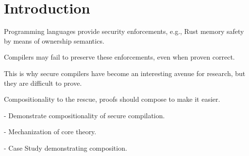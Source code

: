 

\section{Introduction}\label{sec:introduction}

Programming languages provide security enforcements, e.g., Rust memory safety by means of ownership semantics.

Compilers may fail to preserve these enforcements, even when proven correct.

This is why secure compilers have become an interesting avenue for research, but they are difficult to prove.

Compositionality to the rescue, proofs should compose to make it easier.


- Demonstrate compositionality of secure compilation.

- Mechanization of core theory.

- Case Study demonstrating composition.


